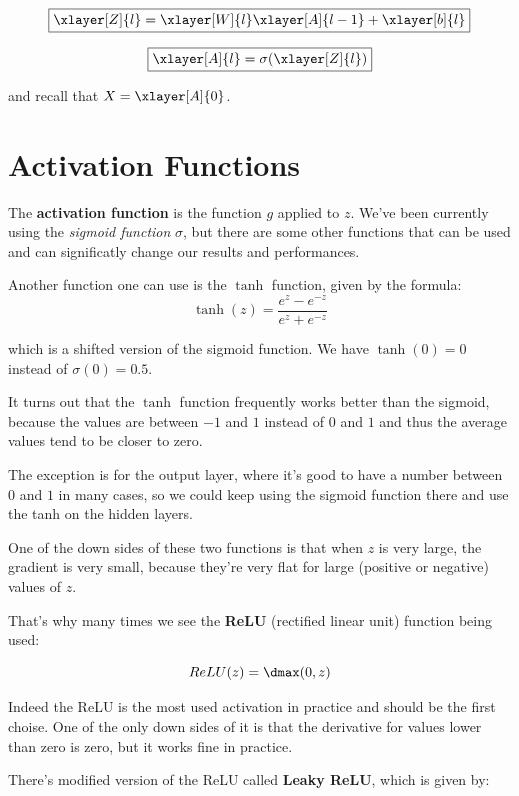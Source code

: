 \documentclass[12pt, a4paper, oneside]{book}
\begin{document}
\begin{equation}
    \boxed{\xlayer[Z]{l}=\xlayer[W]{l}\xlayer[A]{l-1}+\xlayer[b]{l}}
\end{equation}

\begin{equation}
    \boxed{\xlayer[A]{l}=\sigma(\xlayer[Z]{l})}
\end{equation}

and recall that $X=\xlayer[A]{0}$.

\section{Activation Functions}%
\label{sec:activation_functions}

The \textbf{activation function} is the function $g$ applied to $z$. We've
been currently using the \textit{sigmoid function} $\sigma$, but there are some
other functions that can be used and can significatly change our results and
performances.

Another function one can use is the $\tanh$ function, given by the formula:
\[
    \tanh(z) = \dfrac{e^{z}-e^{-z}}{e^{z}+e^{-z}}
\]

which is a shifted version of the sigmoid function. We have $\tanh(0)=0$ instead
of $\sigma(0)=0.5$.

It turns out that the $\tanh$ function frequently works better than the sigmoid,
because the values are between $-1$ and $1$ instead of $0$ and $1$ and thus the
average values tend to be closer to zero.

The exception is for the output layer, where it's good to have a number between
$0$ and $1$ in many cases, so we could keep using the sigmoid function there and
use the tanh on the hidden layers.

One of the down sides of these two functions is that when $z$ is very large, the
gradient is very small, because they're very flat for large (positive or
negative) values of $z$.

That's why many times we see the \textbf{ReLU} (rectified linear unit) function
being used:

\[
    ReLU(z) = \dmax(0,z)
\]

Indeed the ReLU is the most used activation in practice and should be the first
choise. One of the only down sides of it is that the derivative for values lower
than zero is zero, but it works fine in practice.

There's modified version of the ReLU called \textbf{Leaky ReLU}, which is given
by:
\end{document}

